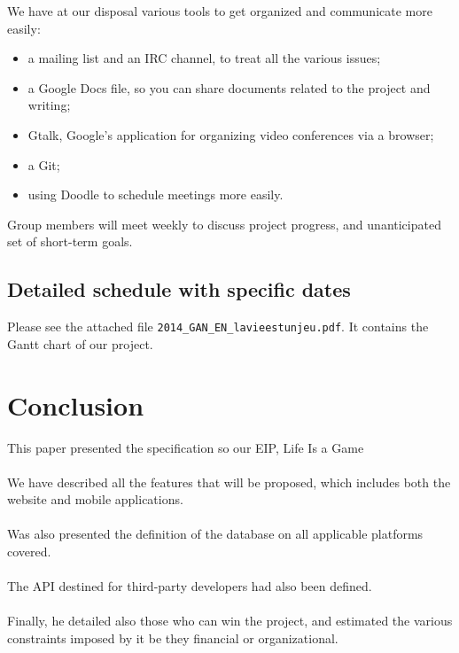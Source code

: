 \documentclass{life-fr}
\begin{document}
We have at our disposal various tools to get organized and communicate more easily: \\

\begin{itemize}
  \item a mailing list and an IRC channel, to treat all the various issues;
  \item a Google Docs file, so you can share documents related to the project and writing;
  \item Gtalk, Google's application for organizing video conferences via a browser;
  \item a Git;
  \item using Doodle to schedule meetings more easily.
\end{itemize}

Group members will meet weekly to discuss project progress, and unanticipated set of short-term goals.

\section{Detailed schedule with specific dates}

Please see the attached file \texttt {2014\_GAN\_EN\_lavieestunjeu.pdf}. It contains the Gantt chart of our project.


\newpage
\hspace{2cm}
\newpage


\chapter{Conclusion}

This paper presented the specification so our EIP, Life Is a Game \\
\\
We have described all the features that will be proposed, which includes both the website and mobile applications.\\
\\
Was also presented the definition of the database on all applicable platforms covered.\\
\\
The API destined for third-party developers had also been defined.\\
\\
Finally, he detailed also those who can win the project, and estimated the various constraints imposed by it be they financial or organizational.\\

\newpage
\hspace{2cm}
\newpage
\end{document}

